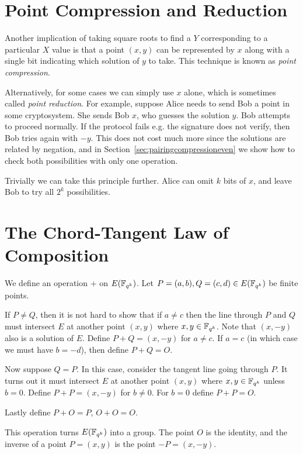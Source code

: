 \section {Point Compression and Reduction}

Another implication of taking square roots to find a $Y$ corresponding to
a particular $X$ value is that a point $(x,y)$ can be represented by $x$ along
with a single bit indicating which solution of $y$ to take. This technique is
known as \emph{point compression}.

Alternatively, for some cases we can simply use $x$ alone, which is sometimes
called \emph{point reduction}. For example, suppose Alice needs to send Bob a
point in some cryptosystem. She sends Bob $x$, who guesses the solution $y$.
Bob attempts to proceed normally. If the protocol fails e.g. the signature does
not verify, then Bob tries again with $-y$. This does not cost much more since
the solutions are related by negation, and in
Section~\ref{sec:pairingcompressioneven} we show how to check both
possibilities with only one operation.

Trivially we can take this principle further. Alice can
omit $k$ bits of $x$, and leave Bob to try all $2^k$ possibilities.

\section {The Chord-Tangent Law of Composition}

We define an operation $+$ on $E(\mathbb{F}_{q^k})$.
Let $P = (a,b), Q = (c,d) \in E(\mathbb{F}_{q^k})$ be finite points.

If $P \ne Q$, then it is not hard to show that if $a \ne c$
then the line through $P$ and $Q$ must intersect $E$ at another point
$(x,y)$ where $x, y\in \mathbb{F}_{q^k}$. Note that $(x,-y)$ also is a solution of $E$.
Define $P + Q = (x, -y)$ for $a \ne c$.
If $a = c$ (in which case we must have $b = -d$),
then define $P + Q = O$.

Now suppose $Q = P$. In this case, consider the tangent line going through
$P$. It turns out it must intersect $E$ at another point $(x,y)$ where
$x,y\in\mathbb{F}_{q^k}$ unless $b = 0$. Define $P + P = (x, -y)$ for $b \ne 0$.
For $b = 0$ define $P + P = O$.

Lastly define $P + O = P$, $O + O = O$.

This operation turns $E(\mathbb{F}_{q^k})$ into a group.
The point $O$ is the identity, and the inverse
of a point $P = (x,y)$ is the point $-P = (x,-y)$.

